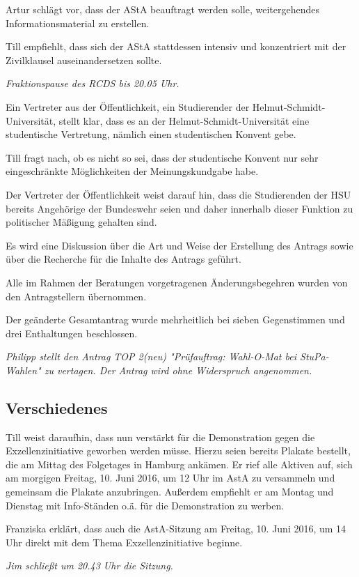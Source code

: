 \documentclass[ngerman,headheight=70pt]{scrartcl}
\begin{document}
    Artur schlägt vor, dass der AStA beauftragt werden solle, weitergehendes
    Informationsmaterial zu erstellen.

    Till empfiehlt, dass sich der AStA stattdessen intensiv und konzentriert mit
    der Zivilklausel auseinandersetzen sollte.

    \textit{Fraktionspause des RCDS bis 20.05 Uhr.}

    Ein Vertreter aus der Öffentlichkeit, ein Studierender der
    Helmut-Schmidt-Universität, stellt klar, dass es an der Helmut-Schmidt-Universität
    eine studentische Vertretung, nämlich einen studentischen Konvent gebe.

    Till fragt nach, ob es nicht so sei, dass der studentische Konvent nur sehr
    eingeschränkte Möglichkeiten der Meinungskundgabe habe.

    Der Vertreter der Öffentlichkeit weist darauf hin, dass die Studierenden der
    HSU bereits Angehörige der Bundeswehr seien und daher innerhalb dieser
    Funktion zu politischer Mäßigung gehalten sind.

    Es wird eine Diskussion über die Art und Weise der Erstellung des Antrags
    sowie über die Recherche für die Inhalte des Antrags geführt.

    Alle im Rahmen der Beratungen vorgetragenen Änderungsbegehren wurden von den
    Antragstellern übernommen.

    Der geänderte Gesamtantrag wurde mehrheitlich bei sieben Gegenstimmen und
    drei Enthaltungen beschlossen.

    \textit{Philipp stellt den Antrag TOP 2(neu) "Prüfauftrag: Wahl-O-Mat bei
    StuPa-Wahlen" zu vertagen. Der Antrag wird ohne Widerspruch angenommen.}

    \subsection{Verschiedenes}

    Till weist daraufhin, dass nun verstärkt für die Demonstration gegen die
    Exzellenzinitiative geworben werden müsse. Hierzu seien bereits Plakate bestellt,
    die am Mittag des Folgetages in Hamburg ankämen. Er rief alle Aktiven auf,
    sich am morgigen Freitag, 10. Juni 2016, um 12 Uhr im AstA zu versammeln und
    gemeinsam die Plakate anzubringen. Außerdem empfiehlt er am Montag und
    Dienstag mit Info-Ständen o.ä. für die Demonstration zu werben.

    Franziska erklärt, dass auch die AstA-Sitzung am Freitag, 10. Juni 2016, um
    14 Uhr direkt mit dem Thema Exzellenzinitiative beginne.

    \textit{Jim schließt um 20.43 Uhr die Sitzung.}
\end{document}
